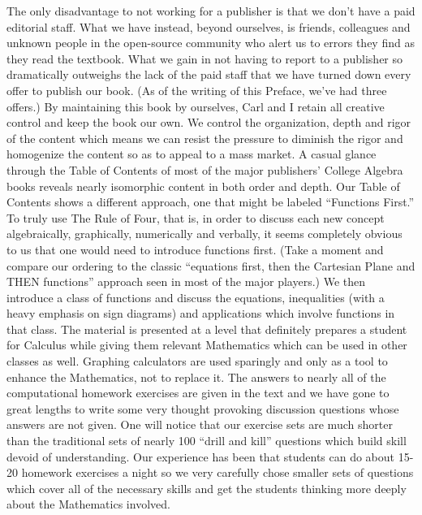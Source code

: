 \documentclass{ximera}
\begin{document}
\medskip

\noindent The only disadvantage to not working for a publisher is that we don't have a paid editorial staff.  What we have instead, beyond ourselves, is friends, colleagues and unknown people in the open-source community who alert us to errors they find as they read the textbook.  What we gain in not having to report to a publisher so dramatically outweighs the lack of the paid staff that we have turned down every offer to publish our book.  (As of the writing of this Preface, we've had three offers.)  By maintaining this book by ourselves, Carl and I retain all creative control and keep the book our own.  We control the organization, depth and rigor of the content which means we can resist the pressure to diminish the rigor and homogenize the content so as to appeal to a mass market.  A casual glance through the Table of Contents of most of the major publishers' College Algebra books reveals nearly isomorphic content in both order and depth.   Our Table of Contents shows a different approach, one that might be labeled ``Functions First.''  To truly use The Rule of Four, that is, in order to discuss each new concept algebraically, graphically, numerically and verbally, it seems completely obvious to us that one would need to introduce functions first.  (Take a moment and compare our ordering to the classic ``equations first, then the Cartesian Plane and THEN functions'' approach seen in most of the major players.)  We then introduce a class of functions and discuss the equations, inequalities (with a heavy emphasis on sign diagrams) and applications which involve functions in that class.  The material is presented at a level that definitely prepares a student for Calculus while giving them relevant Mathematics which can be used in other classes as well.  Graphing calculators are used sparingly and only as a tool to enhance the Mathematics, not to replace it.  The answers to nearly all of the computational homework exercises are given in the text and we have gone to great lengths to write some very thought provoking discussion questions whose answers are not given.  One will notice that our exercise sets are much shorter than the traditional sets of nearly 100 ``drill and kill'' questions which build skill devoid of understanding.  Our experience has been that students can do about 15-20 homework exercises a night so we very carefully chose smaller sets of questions which cover all of the necessary skills and get the students thinking more deeply about the Mathematics involved.
\end{document}

